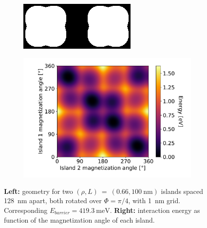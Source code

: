 \documentclass[11pt,a4paper,english]{article}
\begin{document}
\begin{figure}
    \centering
    \begin{subfigure}[c]{4cm} %
         \centering
         \includegraphics[width=\textwidth]{Figures/two_islands/Geometry/geom_r0.66_s100_d128_aPi4,Pi4_cell1nm.png}
     \end{subfigure}
    \begin{subfigure}[c]{0.7\columnwidth}
         \centering
         \includegraphics[width=\textwidth]{Figures/two_islands/EnergyLandscape/Int_aPi4,Pi4_d128_r0.66,0.66_cell1nm.pdf}
     \end{subfigure}
    \caption{\textbf{Left:} geometry for two $(\rho, L)~=~(0.66, \SI{100}{\nano\metre})$ islands spaced \SI{128}{\nano\metre} apart, both rotated over $\Phi=\pi/4$, with \SI{1}{\nano\metre} grid. Corresponding $E_{barrier}=\SI{419.3}{\milli\electronvolt}$. \textbf{Right:} interaction energy as function of the magnetization angle of each island.}
    \label{fig:two-islands_interaction_(r0.66_L100)_aPi4andPi4}
\end{figure}
\end{document}
